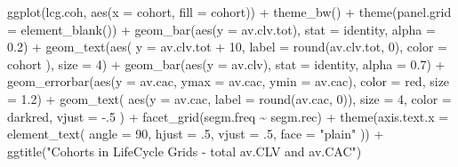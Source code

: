 \documentclass[
]{book}
\newenvironment{Shaded}{\begin{snugshade}}{\end{snugshade}}
\newcommand{\AttributeTok}[1]{\textcolor[rgb]{0.77,0.63,0.00}{#1}}
\newcommand{\DecValTok}[1]{\textcolor[rgb]{0.00,0.00,0.81}{#1}}
\newcommand{\FloatTok}[1]{\textcolor[rgb]{0.00,0.00,0.81}{#1}}
\newcommand{\FunctionTok}[1]{\textcolor[rgb]{0.00,0.00,0.00}{#1}}
\newcommand{\NormalTok}[1]{#1}
\newcommand{\SpecialCharTok}[1]{\textcolor[rgb]{0.00,0.00,0.00}{#1}}
\newcommand{\StringTok}[1]{\textcolor[rgb]{0.31,0.60,0.02}{#1}}
\begin{document}
\begin{Shaded}
\begin{Highlighting}[]
\FunctionTok{ggplot}\NormalTok{(lcg.coh, }\FunctionTok{aes}\NormalTok{(}\AttributeTok{x =}\NormalTok{ cohort, }\AttributeTok{fill =}\NormalTok{ cohort)) }\SpecialCharTok{+}
    \FunctionTok{theme\_bw}\NormalTok{() }\SpecialCharTok{+}
    \FunctionTok{theme}\NormalTok{(}\AttributeTok{panel.grid =} \FunctionTok{element\_blank}\NormalTok{()) }\SpecialCharTok{+}
    \FunctionTok{geom\_bar}\NormalTok{(}\FunctionTok{aes}\NormalTok{(}\AttributeTok{y =}\NormalTok{ av.clv.tot), }\AttributeTok{stat =} \StringTok{\textquotesingle{}identity\textquotesingle{}}\NormalTok{, }\AttributeTok{alpha =} \FloatTok{0.2}\NormalTok{) }\SpecialCharTok{+}
    \FunctionTok{geom\_text}\NormalTok{(}\FunctionTok{aes}\NormalTok{(}
        \AttributeTok{y =}\NormalTok{ av.clv.tot }\SpecialCharTok{+} \DecValTok{10}\NormalTok{,}
        \AttributeTok{label =} \FunctionTok{round}\NormalTok{(av.clv.tot, }\DecValTok{0}\NormalTok{),}
        \AttributeTok{color =}\NormalTok{ cohort}
\NormalTok{    ), }\AttributeTok{size =} \DecValTok{4}\NormalTok{) }\SpecialCharTok{+}
    \FunctionTok{geom\_bar}\NormalTok{(}\FunctionTok{aes}\NormalTok{(}\AttributeTok{y =}\NormalTok{ av.clv), }\AttributeTok{stat =} \StringTok{\textquotesingle{}identity\textquotesingle{}}\NormalTok{, }\AttributeTok{alpha =} \FloatTok{0.7}\NormalTok{) }\SpecialCharTok{+}
    \FunctionTok{geom\_errorbar}\NormalTok{(}\FunctionTok{aes}\NormalTok{(}\AttributeTok{y =}\NormalTok{ av.cac, }\AttributeTok{ymax =}\NormalTok{ av.cac, }\AttributeTok{ymin =}\NormalTok{ av.cac),}
                  \AttributeTok{color =} \StringTok{\textquotesingle{}red\textquotesingle{}}\NormalTok{,}
                  \AttributeTok{size =} \FloatTok{1.2}\NormalTok{) }\SpecialCharTok{+}
    \FunctionTok{geom\_text}\NormalTok{(}
        \FunctionTok{aes}\NormalTok{(}\AttributeTok{y =}\NormalTok{ av.cac, }\AttributeTok{label =} \FunctionTok{round}\NormalTok{(av.cac, }\DecValTok{0}\NormalTok{)),}
        \AttributeTok{size =} \DecValTok{4}\NormalTok{,}
        \AttributeTok{color =} \StringTok{\textquotesingle{}darkred\textquotesingle{}}\NormalTok{,}
        \AttributeTok{vjust =} \SpecialCharTok{{-}}\NormalTok{.}\DecValTok{5}
\NormalTok{    ) }\SpecialCharTok{+}
    \FunctionTok{facet\_grid}\NormalTok{(segm.freq }\SpecialCharTok{\textasciitilde{}}\NormalTok{ segm.rec) }\SpecialCharTok{+}
    \FunctionTok{theme}\NormalTok{(}\AttributeTok{axis.text.x =} \FunctionTok{element\_text}\NormalTok{(}
        \AttributeTok{angle =} \DecValTok{90}\NormalTok{,}
        \AttributeTok{hjust =}\NormalTok{ .}\DecValTok{5}\NormalTok{,}
        \AttributeTok{vjust =}\NormalTok{ .}\DecValTok{5}\NormalTok{,}
        \AttributeTok{face =} \StringTok{"plain"}
\NormalTok{    )) }\SpecialCharTok{+}
    \FunctionTok{ggtitle}\NormalTok{(}\StringTok{"Cohorts in LifeCycle Grids {-} total av.CLV and av.CAC"}\NormalTok{)}


\end{Highlighting}
\end{Shaded}
\end{document}
